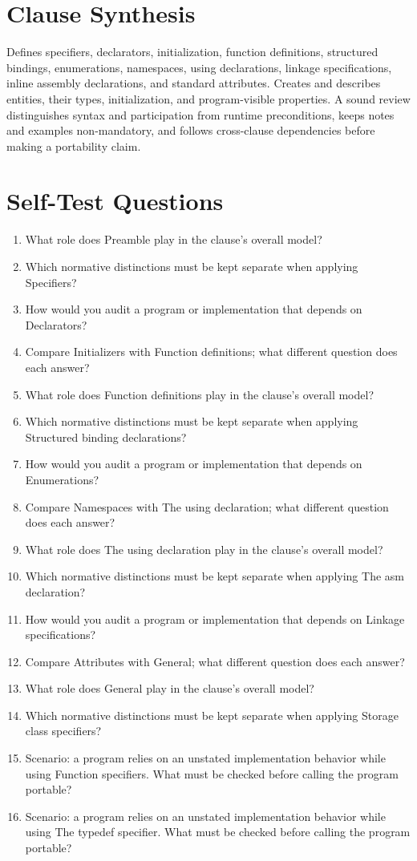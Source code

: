 \documentclass[11pt,letterpaper]{article}
\begin{document}
\section{Clause Synthesis}
\begin{CornellReferenceOrientationBox}Defines specifiers, declarators, initialization, function definitions, structured bindings, enumerations, namespaces, using declarations, linkage specifications, inline assembly declarations, and standard attributes. Creates and describes entities, their types, initialization, and program-visible properties. A sound review distinguishes syntax and participation from runtime preconditions, keeps notes and examples non-mandatory, and follows cross-clause dependencies before making a portability claim.\end{CornellReferenceOrientationBox}
\section{Self-Test Questions}
\begin{enumerate}
\item What role does Preamble play in the clause's overall model?
\item Which normative distinctions must be kept separate when applying Specifiers?
\item How would you audit a program or implementation that depends on Declarators?
\item Compare Initializers with Function definitions; what different question does each answer?
\item What role does Function definitions play in the clause's overall model?
\item Which normative distinctions must be kept separate when applying Structured binding declarations?
\item How would you audit a program or implementation that depends on Enumerations?
\item Compare Namespaces with The using declaration; what different question does each answer?
\item What role does The using declaration play in the clause's overall model?
\item Which normative distinctions must be kept separate when applying The asm declaration?
\item How would you audit a program or implementation that depends on Linkage specifications?
\item Compare Attributes with General; what different question does each answer?
\item What role does General play in the clause's overall model?
\item Which normative distinctions must be kept separate when applying Storage class specifiers?
\item Scenario: a program relies on an unstated implementation behavior while using Function specifiers. What must be checked before calling the program portable?
\item Scenario: a program relies on an unstated implementation behavior while using The typedef specifier. What must be checked before calling the program portable?
\end{enumerate}
\end{document}
